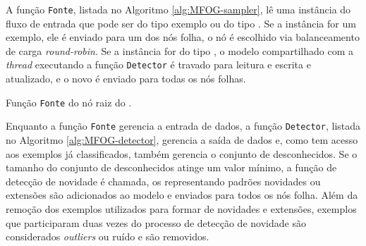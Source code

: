A função \texttt{Fonte}, listada no Algoritmo \ref{alg:MFOG-sampler}, lê uma
instância do fluxo de entrada que pode ser do tipo exemplo ou do tipo \mcluster.
Se a instância for um exemplo, ele é enviado para um dos nós folha, o nó é
escolhido via balanceamento de carga \emph{round-robin}.
Se a instância for do tipo \mcluster, o modelo compartilhado com a \emph{thread}
executando a função \texttt{Detector} é travado para leitura e escrita e
atualizado, e o novo \mcluster é enviado para todas os nós folhas.

\begin{algorithm}[htb]
    
\caption{Função \texttt{Fonte} do nó raiz do \mfog.}
\label{alg:MFOG-sampler}
\end{algorithm}

Enquanto a função \texttt{Fonte} gerencia a entrada de dados, a função
\texttt{Detector}, listada no Algoritmo \ref{alg:MFOG-detector}, gerencia a saída
de dados e, como tem acesso aos exemplos já classificados, também gerencia o
conjunto de desconhecidos.
Se o tamanho do conjunto de desconhecidos atinge um valor mínimo, a função de
detecção de novidade é chamada, os \mclusters representando padrões novidades ou
extensões são adicionados ao modelo e enviados para todos os nós folha.
Além da remoção dos exemplos utilizados para formar \mclusters de novidades e
extensões, exemplos que participaram duas vezes do processo de detecção de
novidade são considerados \emph{outliers} ou ruído e são removidos.

